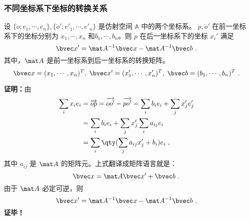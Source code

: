 \subsubsection{不同坐标系下坐标的转换关系}
\begin{theorem}{}\label{the_AfSp_3}
设 $\{\dot o;e_1,\cdots,e_n\},\{\dot o';e'_1,\cdots,e'_n\}$ 是仿射空间 $\mathbb A$ 中的两个坐标系。 $\dot p,\dot o'$ 在前一坐标系下的坐标分别为 $x_1,\cdots,x_n$ 和$b_1,\cdots,b_n$。则 $\dot p$ 在后一坐标系下的坐标 $x_i'$ 满足
\begin{equation}
\bvec x'=\mat A^{-1}\bvec x-\mat A^{-1}\bvec b~.
\end{equation}
 其中，$\mat A$ 是前一坐标系到后一坐标系的转换矩阵。
 \begin{equation}
 \bvec x=(x_1,\cdots,x_n)^T,\;\bvec x'=(x_1',\cdots,x_n')^T,\;\bvec b=(b_1,\cdots,b_n)^T~.
 \end{equation}
 
\end{theorem}
\textbf{证明：}由
\begin{equation}
\begin{aligned}
\sum_{i}x_ie_i&=\overrightarrow{op}=\overrightarrow{oo'}-\overrightarrow{po'}=\sum_{i}b_ie_i+\sum_{j}x'_je'_j\\
&=\sum_i b_ie_i+\sum_{j}x'_j\sum_{i}a_{ij}e_i\\
&=\sum_{i}\qty(\sum_{j}a_{ij}x_j'+b_i)e_i~,
\end{aligned}
\end{equation}
其中 $a_{ij}$ 是 $\mat A$ 的矩阵元。上式翻译成矩阵语言就是：
\begin{equation}
\bvec x=\mat A\bvec x'+\bvec b~.
\end{equation}
由于 $\mat A$ 必定可逆，则
\begin{equation}
\bvec x'=\mat A^{-1}\bvec x-\mat A^{-1}\bvec b~.
\end{equation}
\textbf{证毕！}

